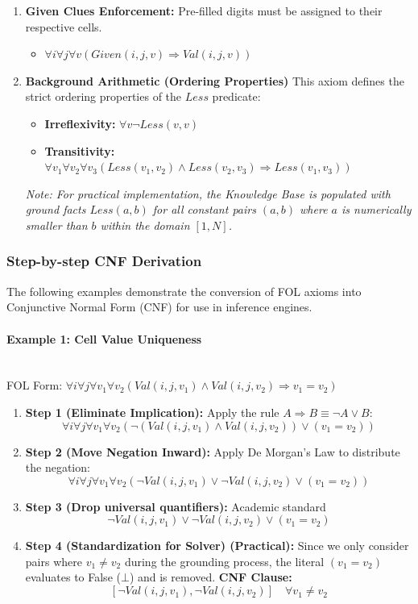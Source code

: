 \begin{enumerate}
    \item \textbf{Given Clues Enforcement:} Pre-filled digits must be assigned to their respective cells.
    \begin{itemize}
        \item $\forall i \forall j \forall v (Given(i, j, v) \Rightarrow Val(i, j, v))$
    \end{itemize}

    \item \textbf{Background Arithmetic (Ordering Properties)}
    This axiom defines the strict ordering properties of the $Less$ predicate:
    \begin{itemize}
        \item \textbf{Irreflexivity:} $\forall v \neg Less(v, v)$
        \item \textbf{Transitivity:} $\forall v_1 \forall v_2 \forall v_3 (Less(v_1, v_2) \wedge Less(v_2, v_3) \Rightarrow Less(v_1, v_3))$
    \end{itemize}
    \textit{Note: For practical implementation, the Knowledge Base is populated with ground facts $Less(a, b)$ for all constant pairs $(a, b)$ where $a$ is numerically smaller than $b$ within the domain $[1, N]$.}
\end{enumerate}

\subsubsection{Step-by-step CNF Derivation}
The following examples demonstrate the conversion of FOL axioms into Conjunctive Normal Form (CNF) for use in inference engines.

\paragraph{Example 1: Cell Value Uniqueness}~\\
FOL Form: $\forall i \forall j \forall v_1 \forall v_2 (Val(i, j, v_1) \wedge Val(i, j, v_2) \Rightarrow v_1 = v_2)$
\begin{enumerate}
    \item \textbf{Step 1 (Eliminate Implication):} Apply the rule $A \Rightarrow B \equiv \neg A \vee B$:
    $$\forall i \forall j \forall v_1 \forall v_2 (\neg (Val(i, j, v_1) \wedge Val(i, j, v_2)) \vee (v_1 = v_2))$$
    \item \textbf{Step 2 (Move Negation Inward):} Apply De Morgan's Law to distribute the negation:
    $$\forall i \forall j \forall v_1 \forall v_2 (\neg Val(i, j, v_1) \vee \neg Val(i, j, v_2) \vee (v_1 = v_2))$$
    \item \textbf{Step 3 (Drop universal quantifiers):} Academic standard
    $$\neg Val(i, j, v_1) \vee \neg Val(i, j, v_2) \vee (v_1 = v_2)$$
    \item \textbf{Step 4 (Standardization for Solver) (Practical):} Since we only consider pairs where $v_1 \neq v_2$ during the grounding process, the literal $(v_1 = v_2)$ evaluates to False ($\bot$) and is removed.
    \textbf{CNF Clause:} $$[\neg Val(i, j, v_1), \neg Val(i, j, v_2)] \quad \forall v_1 \neq v_2$$
\end{enumerate}

